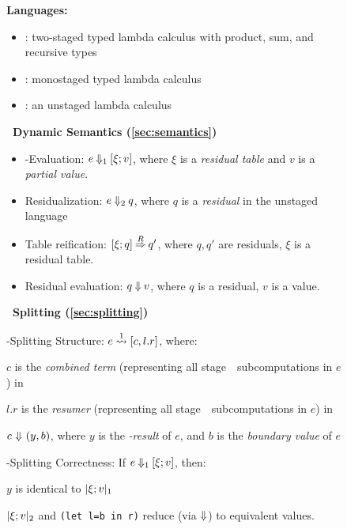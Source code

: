 \begin{figure*}
\textbf{Languages:}
\begin{itemize}
\item \lang: two-staged typed lambda calculus with product, sum, and
  recursive types
\item \langTwo: monostaged typed lambda calculus
\item \langmono: an unstaged lambda calculus
\end{itemize}

\textbf{\lang\ Dynamic Semantics (\ref{sec:semantics})}
\begin{itemize}
\item 
\bbone-Evaluation: $e\mathbin{{\Downarrow_{ 1}}}[\xi;v]$, where $\xi$ is a \emph{residual table} and $v$ is a \emph{partial value}. 

\item
Residualization: $e\mathbin{{\Downarrow_{ 2}}}q$, where $q$ is a \emph{residual} in the unstaged language \langTwo

\item 
Table reification: $[\xi;q]\mathbin{\overset{R}\Rightarrow} q'$, where $q,q'$ are residuals,
$\xi$ is a residual table.

\item
Residual evaluation: $q\mathbin{{\Downarrow}} v$, where $q$ is a residual, $v$ is a
value.
\end{itemize}

\textbf{\lang\ Splitting (\ref{sec:splitting})}

\hspace{2em}\bbone-Splitting Structure: $e \overset{ 1}\rightsquigarrow [c,l.r]$, where:

\hspace{4em}$c$ is the \emph{combined term}
(representing all stage~\bbone\ subcomputations in $e$)
in \langmono

\hspace{4em}$l.r$ is the \emph{resumer}
(representing all stage~\bbtwo\ subcomputations in $e$)
in \langmono

\hspace{4em}$c~{\Downarrow}~(y,b)$, where 
$y$ is the \emph{\bbone-result} of $e$, and
$b$ is the \emph{boundary value} of $e$

\hspace{2em}\bbone-Splitting Correctness: If $e\mathbin{{\Downarrow_{ 1}}}[\xi;v]$, then:

\hspace{4em}$y$ is identical to $|\xi;v|_{ 1}$

\hspace{4em}$|\xi;v|_{ 2}$ and \texttt{(let l=b in r)} 
reduce (via ${\Downarrow}$) to equivalent values.  


\end{figure*}
